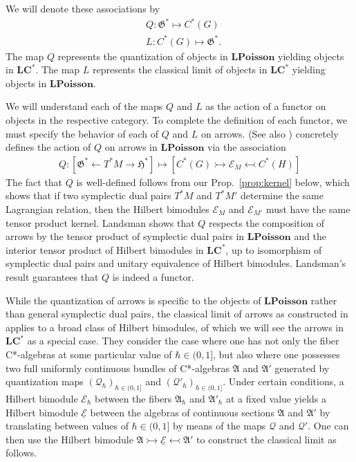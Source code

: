 \documentclass[sn-mathphys,Numbered]{sn-jnl}
\begin{document}
We will denote these associations by
\begin{align}
    &Q: \mathfrak{G}^*\mapsto C^*(G)\\
    &L: C^*(G)\mapsto \mathfrak{G}^*.
\end{align}
The map $Q$ represents the quantization of objects in $\mathbf{LPoisson}$ yielding objects in $\mathbf{LC^*}$.  The map $L$ represents the classical limit of objects in $\mathbf{LC^*}$ yielding objects in $\mathbf{LPoisson}$.

We will understand each of the maps $Q$ and $L$ as the action of a functor on objects in the respective category.  To complete the definition of each functor, we must specify the behavior of each of $Q$ and $L$ on arrows.  \citet{La01a,La02a} (See also \citep{La00}) concretely defines the action of $Q$ on arrows in $\mathbf{LPoisson}$ via the association
\begin{align}
    Q: [\mathfrak{G}^*\leftarrow T^*M\rightarrow \mathfrak{H}^*]\mapsto [C^*(G)\rightarrowtail\mathcal{E}_M\leftarrowtail C^*(H)]
\end{align}
The fact that $Q$ is well-defined follows from our Prop.~\ref{prop:kernel} below, which shows that if two symplectic dual pairs $T^*M$ and $T^*M'$ determine the same Lagrangian relation, then the Hilbert bimodules $\mathcal{E}_M$ and $\mathcal{E}_{M'}$ must have the same tensor product kernel.  Landsman shows that $Q$ respects the composition of arrows by the tensor product of symplectic dual pairs in $\mathbf{LPoisson}$ and the interior tensor product of Hilbert bimodules in $\mathbf{LC^*}$, up to isomorphism of symplectic dual pairs and unitary equivalence of Hilbert bimodules.  Landsman's result guarantees that $Q$ is indeed a functor.

While the quantization of arrows is specific to the objects of $\mathbf{LPoisson}$ rather than general symplectic dual pairs, the classical limit of arrows as constructed in \citet{FeSt24} applies to a broad class of Hilbert bimodules, of which we will see the arrows in $\mathbf{LC^*}$ as a special case.  They consider the case where one has not only the fiber C*-algebras at some particular value of $\hbar\in (0,1]$, but also where one possesses two full uniformly continuous bundles of C*-algebras $\mathfrak{A}$ and $\mathfrak{A}'$ generated by quantization maps $(\mathcal{Q}_\hbar)_{\hbar\in (0,1]}$ and $(\mathcal{Q}'_\hbar)_{\hbar\in (0,1]}$.  Under certain conditions, a Hilbert bimodule $\mathcal{E}_\hbar$ between the fibers $\mathfrak{A}_\hbar$ and $\mathfrak{A}'_\hbar$ at a fixed value yields a Hilbert bimodule $\underline{\mathcal{E}}$ between the algebras of continuous sections $\mathfrak{A}$ and $\mathfrak{A}'$ by translating between values of $\hbar\in (0,1]$ by means of the maps $\mathcal{Q}$ and $\mathcal{Q}'$.  One can then use the Hilbert bimodule $\mathfrak{A}\rightarrowtail\underline{\mathcal{E}}\leftarrowtail\mathfrak{A}'$ to construct the classical limit as follows.
\end{document}
